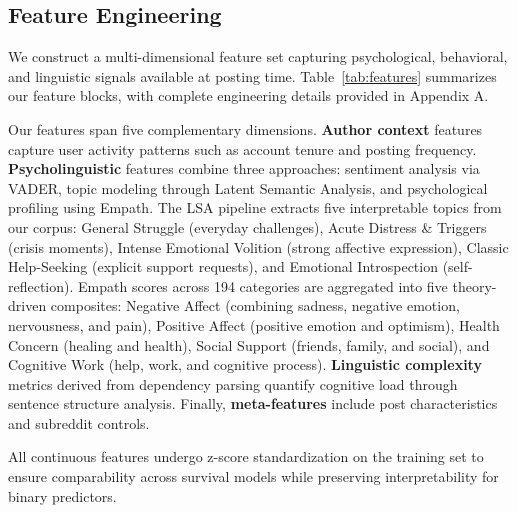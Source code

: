 \documentclass[letterpaper]{article} %
\begin{document}
\subsection{Feature Engineering}

We construct a multi-dimensional feature set capturing psychological, behavioral, and linguistic signals available at posting time. Table~\ref{tab:features} summarizes our feature blocks, with complete engineering details provided in Appendix A.

Our features span five complementary dimensions. \textbf{Author context} features capture user activity patterns such as account tenure and posting frequency. \textbf{Psycholinguistic} features combine three approaches: sentiment analysis via VADER, topic modeling through Latent Semantic Analysis, and psychological profiling using Empath. The LSA pipeline extracts five interpretable topics from our corpus: General Struggle (everyday challenges), Acute Distress \& Triggers (crisis moments), Intense Emotional Volition (strong affective expression), Classic Help-Seeking (explicit support requests), and Emotional Introspection (self-reflection). Empath scores across 194 categories are aggregated into five theory-driven composites: Negative Affect (combining sadness, negative emotion, nervousness, and pain), Positive Affect (positive emotion and optimism), Health Concern (healing and health), Social Support (friends, family, and social), and Cognitive Work (help, work, and cognitive process). \textbf{Linguistic complexity} metrics derived from dependency parsing quantify cognitive load through sentence structure analysis. Finally, \textbf{meta-features} include post characteristics and subreddit controls.

All continuous features undergo z-score standardization on the training set to ensure comparability across survival models while preserving interpretability for binary predictors.


\begin{table}[h]
\centering
\setlength{\tabcolsep}{1pt}
\fontsize{8pt}{10pt}\selectfont 
{}
\caption{Feature set overview}
\label{tab:features}
\end{table}
\end{document}
